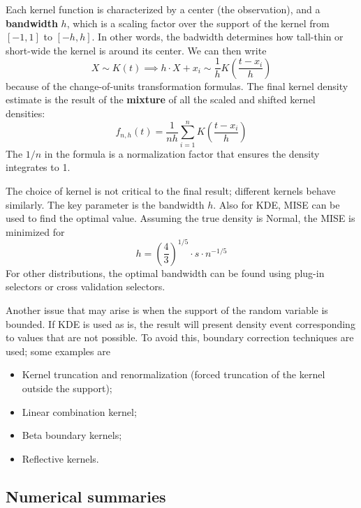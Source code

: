 Each kernel function is characterized by a center (the observation), and a \textbf{bandwidth} $h$, which is a scaling factor over the support of the kernel from $[-1, 1]$ to $[-h, h]$. In other words, the badwidth determines how tall-thin or short-wide the kernel is around its center. We can then write
\begin{equation*}
    X \sim K(t) \implies h \cdot X + x_i \sim \frac{1}{h} K \left ( \frac{t - x_i}{h} \right )
\end{equation*}   
because of the change-of-units transformation formulas. The final kernel density estimate is the result of the \textbf{mixture} of all the scaled and shifted kernel densities:
\begin{equation*}
    f_{n,h} (t) = \frac{1}{nh} \sum_{i=1}^n K\left ( \frac{t-x_i}{h}\right )
\end{equation*}
The $1/n$ in the formula is a normalization factor that ensures the density integrates to 1.

The choice of kernel is not critical to the final result; different kernels behave similarly. The key parameter is the bandwidth $h$. Also for KDE, MISE can be used to find the optimal value. Assuming the true density is Normal, the MISE is minimized for
\begin{equation*}
    h = \left (\frac{4}{3} \right )^{1/5} \cdot s \cdot n^{-1/5}
\end{equation*}
For other distributions, the optimal bandwidth can be found using plug-in selectors or cross validation selectors.

Another issue that may arise is when the support of the random variable is bounded. If KDE is used as is, the result will present density event corresponding to values that are not possible. To avoid this, boundary correction techniques are used; some examples are
\begin{itemize}
    \item Kernel truncation and renormalization (forced truncation of the kernel outside the support);
    \item Linear combination kernel;
    \item Beta boundary kernels;
    \item Reflective kernels.
\end{itemize}

\subsection{Numerical summaries}

